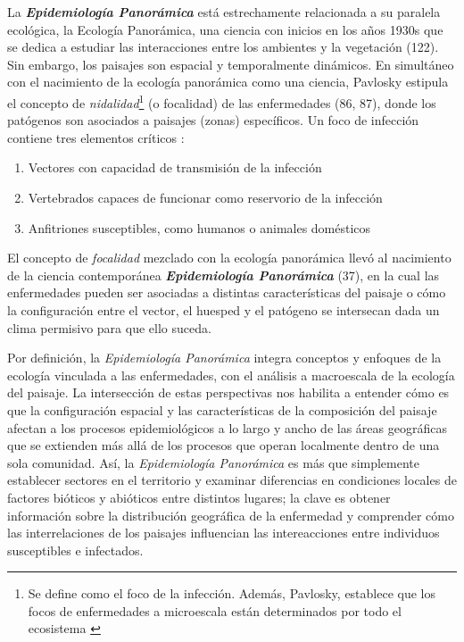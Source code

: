   \par La \textbf{\textit{Epidemiología Panorámica}} está estrechamente relacionada
  a su paralela ecológica, la Ecología Panorámica, una ciencia con inicios en los años
  1930s que se dedica a estudiar las interacciones entre los ambientes y la
  vegetación (122).
  Sin embargo, los paisajes son espacial y temporalmente dinámicos.
  En simultáneo con el nacimiento de la ecología panorámica como una ciencia,
  Pavlosky estipula el concepto de \textit{nidalidad}\footnote{Se define como
  el foco de la infección. Además, Pavlosky, establece que los focos de
  enfermedades a microescala están determinados por todo el ecosistema \cite{nidality}}
  (o focalidad) de las enfermedades (86, 87), donde los patógenos son asociados
  a paisajes (zonas) específicos. Un foco de infección contiene tres elementos
  críticos \cite{reisen_landscape}:
  \begin{enumerate}
    \item Vectores con capacidad de transmisión de la infección
    \item Vertebrados capaces de funcionar como reservorio de la infección
    \item Anfitriones susceptibles, como humanos o animales domésticos
  \end{enumerate}
  El concepto de \textit{focalidad} mezclado con la ecología panorámica
  llevó al nacimiento de la ciencia contemporánea
  \textbf{\textit{Epidemiología Panorámica}} (37), en la cual las enfermedades
  pueden ser asociadas a distintas características del paisaje o cómo
  la configuración entre el vector, el huesped y el patógeno se intersecan
  dada un clima permisivo para que ello suceda.

\par Por definición, la \textit{Epidemiología Panorámica} integra conceptos y
  enfoques de la ecología vinculada a las enfermedades, con el análisis a
  macroescala de la ecología del paisaje. La intersección de estas perspectivas
  nos habilita a entender cómo es que la configuración espacial y las
  características de la composición del paisaje afectan a los procesos
  epidemiológicos a lo largo y ancho de las áreas geográficas que se
  extienden más allá de los procesos que operan localmente dentro de una sola comunidad.
  Así, la \textit{Epidemiología Panorámica} es más que simplemente establecer
  sectores en el territorio y examinar diferencias en condiciones locales de
  factores bióticos y abióticos entre distintos lugares; la clave es obtener
  información sobre la distribución geográfica de la enfermedad y comprender
  cómo las interrelaciones de los paisajes influencian las intereacciones entre
  individuos susceptibles e infectados.

